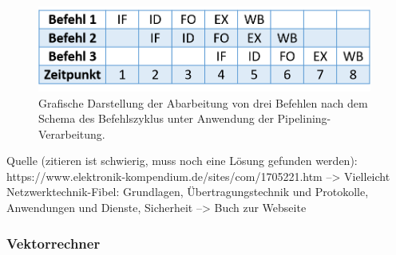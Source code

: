 				\begin{figure}
					\centering	
					\includegraphics[width=11cm]{Abbildungen/Befehlszylus_mit_Pipelining.png}
					\caption{Grafische Darstellung der Abarbeitung von drei Befehlen nach dem Schema des Befehlszyklus unter Anwendung der Pipelining-Verarbeitung.}
					\label{fig:BefehlszylusMitPipelining}
				\end{figure}
			
				Quelle (zitieren ist schwierig, muss noch eine Lösung gefunden werden):
				https://www.elektronik-kompendium.de/sites/com/1705221.htm --> Vielleicht Netzwerktechnik-Fibel: Grundlagen, Übertragungstechnik und Protokolle, Anwendungen und Dienste, Sicherheit --> Buch zur Webseite
				
			\subsubsection{Vektorrechner}
			
